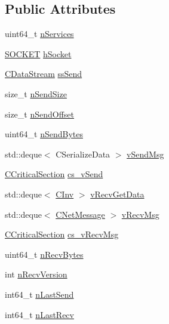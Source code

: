 \subsection*{Public Attributes}
\begin{DoxyCompactItemize}
\item 
uint64\+\_\+t \hyperlink{class_c_node_a8259db81211f6837585c6f82f89414ff}{n\+Services}
\item 
\hyperlink{compat_8h_a26ef1173e2f2c0d3db27eca28397d723}{S\+O\+C\+K\+E\+T} \hyperlink{class_c_node_a7cda6efa6a9ef9db3eebe70fc3bdd45a}{h\+Socket}
\item 
\hyperlink{class_c_data_stream}{C\+Data\+Stream} \hyperlink{class_c_node_a6174b5a3d8d8f6a2daf02be3cf04dc63}{ss\+Send}
\item 
size\+\_\+t \hyperlink{class_c_node_a3c99b7e2b0e53feb58f6859453456f74}{n\+Send\+Size}
\item 
size\+\_\+t \hyperlink{class_c_node_a090bda86de6b84c3db83e1f029d4f453}{n\+Send\+Offset}
\item 
uint64\+\_\+t \hyperlink{class_c_node_a33e24a9544df3c60f9e1ec05b5e91051}{n\+Send\+Bytes}
\item 
std\+::deque$<$ C\+Serialize\+Data $>$ \hyperlink{class_c_node_a68e5fb1a80fe4247aa577a3c9a74b399}{v\+Send\+Msg}
\item 
\hyperlink{sync_8h_a37a4692b2d517f2843655ca11af7668a}{C\+Critical\+Section} \hyperlink{class_c_node_a79edcac83fc5067567c7b41c26fcc56f}{cs\+\_\+v\+Send}
\item 
std\+::deque$<$ \hyperlink{class_c_inv}{C\+Inv} $>$ \hyperlink{class_c_node_a9649c1f27ff0d8f0ba89eb1ea5bee139}{v\+Recv\+Get\+Data}
\item 
std\+::deque$<$ \hyperlink{class_c_net_message}{C\+Net\+Message} $>$ \hyperlink{class_c_node_a015361812daa5b6ebb9a5692ddf67a54}{v\+Recv\+Msg}
\item 
\hyperlink{sync_8h_a37a4692b2d517f2843655ca11af7668a}{C\+Critical\+Section} \hyperlink{class_c_node_abaebfaf8fff7e2e99366ae2bc69af6cd}{cs\+\_\+v\+Recv\+Msg}
\item 
uint64\+\_\+t \hyperlink{class_c_node_a8bbe2a7052476d62acf7f0a5a9c5981b}{n\+Recv\+Bytes}
\item 
int \hyperlink{class_c_node_ab7494353448b922accfb645bd26ac271}{n\+Recv\+Version}
\item 
int64\+\_\+t \hyperlink{class_c_node_af39253ad525733ca64ab3fc785dfc4eb}{n\+Last\+Send}
\item 
int64\+\_\+t \hyperlink{class_c_node_afb40f43a51ba686de93256727351af07}{n\+Last\+Recv}

\end{DoxyCompactItemize}
